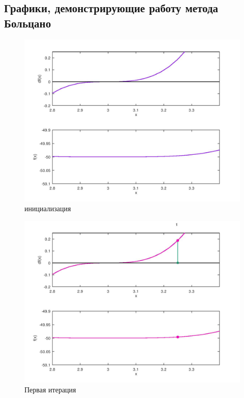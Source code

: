 \documentclass[a4paper,12pt]{article}
\begin{document}
\subsection*{Графики, демонстрирующие работу метода Больцано}
    \begin{figure}[H]
        \centering
        \includegraphics[scale=0.4]{0Bolcanoitter.jpg}
        \caption{инициализация}
    \end{figure}
    \begin{figure}[H]
        \centering
        \includegraphics[scale=0.4]{1Bolcanoitter.jpg}
        \caption{Первая итерация}
    \end{figure}
\end{document}
